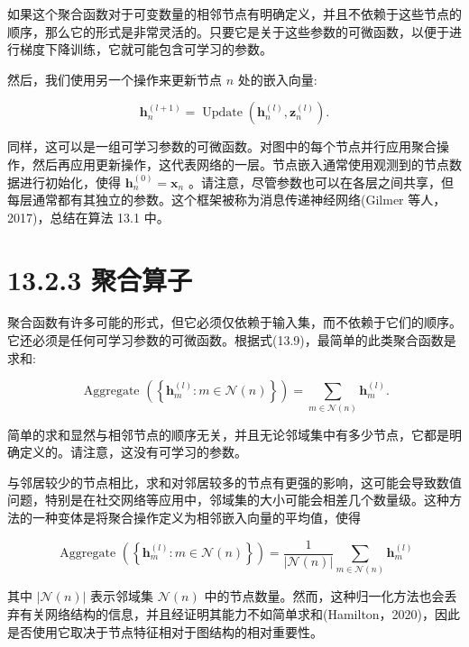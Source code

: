 \documentclass[10pt]{article}
\begin{document}
如果这个聚合函数对于可变数量的相邻节点有明确定义，并且不依赖于这些节点的顺序，那么它的形式是非常灵活的。只要它是关于这些参数的可微函数，以便于进行梯度下降训练，它就可能包含可学习的参数。

然后，我们使用另一个操作来更新节点 \(n\) 处的嵌入向量:

\[
{\mathbf{h}}_{n}^{\left( l + 1\right) } = \operatorname{Update}\left( {{\mathbf{h}}_{n}^{\left( l\right) },{\mathbf{z}}_{n}^{\left( l\right) }}\right) . \tag{13.11}
\]

同样，这可以是一组可学习参数的可微函数。对图中的每个节点并行应用聚合操作，然后再应用更新操作，这代表网络的一层。节点嵌入通常使用观测到的节点数据进行初始化，使得 \({\mathbf{h}}_{n}^{\left( 0\right) } = {\mathbf{x}}_{n}\) 。请注意，尽管参数也可以在各层之间共享，但每层通常都有其独立的参数。这个框架被称为消息传递神经网络(Gilmer 等人，2017)，总结在算法 13.1 中。

\section*{13.2.3 聚合算子}

聚合函数有许多可能的形式，但它必须仅依赖于输入集，而不依赖于它们的顺序。它还必须是任何可学习参数的可微函数。根据式(13.9)，最简单的此类聚合函数是求和:

\[
\text{ Aggregate }\left( \left\{  {{\mathbf{h}}_{m}^{\left( l\right) } : m \in  \mathcal{N}\left( n\right) }\right\}  \right)  = \mathop{\sum }\limits_{{m \in  \mathcal{N}\left( n\right) }}{\mathbf{h}}_{m}^{\left( l\right) }. \tag{13.12}
\]

简单的求和显然与相邻节点的顺序无关，并且无论邻域集中有多少节点，它都是明确定义的。请注意，这没有可学习的参数。

与邻居较少的节点相比，求和对邻居较多的节点有更强的影响，这可能会导致数值问题，特别是在社交网络等应用中，邻域集的大小可能会相差几个数量级。这种方法的一种变体是将聚合操作定义为相邻嵌入向量的平均值，使得

\[
\text{ Aggregate }\left( \left\{  {{\mathbf{h}}_{m}^{\left( l\right) } : m \in  \mathcal{N}\left( n\right) }\right\}  \right)  = \frac{1}{\left| \mathcal{N}\left( n\right) \right| }\mathop{\sum }\limits_{{m \in  \mathcal{N}\left( n\right) }}{\mathbf{h}}_{m}^{\left( l\right) } \tag{13.13}
\]

其中 \(\left| {\mathcal{N}\left( n\right) }\right|\) 表示邻域集 \(\mathcal{N}\left( n\right)\) 中的节点数量。然而，这种归一化方法也会丢弃有关网络结构的信息，并且经证明其能力不如简单求和(Hamilton，2020)，因此是否使用它取决于节点特征相对于图结构的相对重要性。
\end{document}

